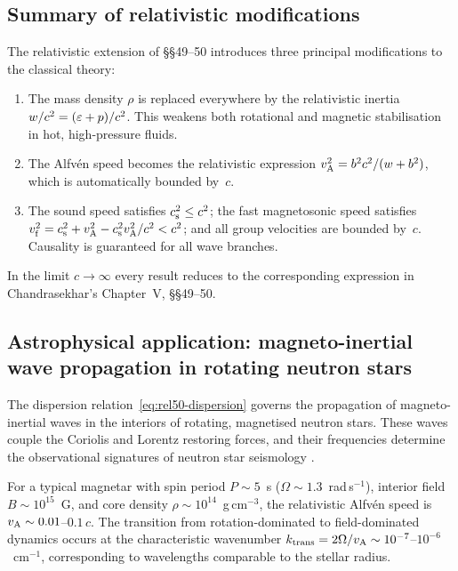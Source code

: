 \subsection{Summary of relativistic modifications}

\begin{relcorrection}
The relativistic extension of \S\S49--50 introduces three principal
modifications to the classical theory:
\begin{enumerate}
\item The mass density $\rho$ is replaced everywhere by the relativistic
  inertia $w/c^{2}=(\varepsilon+p)/c^{2}$.  This weakens both
  rotational and magnetic stabilisation in hot, high-pressure fluids.
\item The Alfv\'en speed becomes the relativistic expression
  $v_{\mathrm{A}}^{2}=b^{2}c^{2}/(w+b^{2})$, which is automatically bounded
  by~$c$.
\item The sound speed satisfies $c_{\mathrm{s}}^{2}\leq c^{2}$; the fast
  magnetosonic speed satisfies
  $v_{\mathrm{f}}^{2}=c_{\mathrm{s}}^{2}+v_{\mathrm{A}}^{2}-c_{\mathrm{s}}^{2}v_{\mathrm{A}}^{2}/c^{2}<c^{2}$; and all group
  velocities are bounded by~$c$.  Causality is guaranteed for all
  wave branches.
\end{enumerate}
In the limit $c\to\infty$ every result reduces to the corresponding
expression in Chandrasekhar's Chapter~V, \S\S49--50.
\end{relcorrection}

\subsection*{Astrophysical application: magneto-inertial wave
  propagation in rotating neutron stars}

The dispersion relation~\eqref{eq:rel50-dispersion} governs the
propagation of magneto-inertial waves in the interiors of rotating,
magnetised neutron stars.  These waves couple the Coriolis and Lorentz
restoring forces, and their frequencies determine the observational
signatures of neutron star seismology
\citep{Israel2005,Strohmayer2005,Watts2006,AnderssonKokkotas1999}.

For a typical magnetar with spin period $P \sim 5$~s
($\Omega \sim 1.3$~rad\,s$^{-1}$), interior field
$B \sim 10^{15}$~G, and core density $\rho \sim 10^{14}$~g\,cm$^{-3}$,
the relativistic Alfv\'en speed is $v_{\mathrm{A}} \sim 0.01$--$0.1\,c$.
The transition from rotation-dominated to field-dominated dynamics
occurs at the characteristic wavenumber
$k_{\mathrm{trans}} = 2\Omega/v_{\mathrm{A}}
\sim 10^{-7}$--$10^{-6}$~cm$^{-1}$,
corresponding to wavelengths comparable to the stellar radius.

